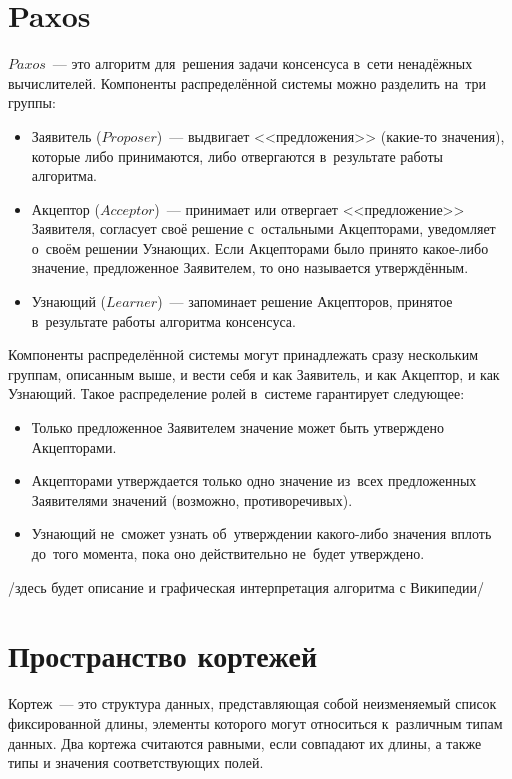 \section{Paxos}\label{sec:3}
$Paxos$~--- это алгоритм для~решения задачи консенсуса в~сети ненадёжных вычислителей. Компоненты распределённой системы можно разделить на~три группы:
\begin{itemize}
	\item Заявитель ($Proposer$)~--- выдвигает <<предложения>> (какие-то значения), которые либо принимаются, либо отвергаются в~результате работы алгоритма.
	\item Акцептор ($Acceptor$)~--- принимает или отвергает <<предложение>> Заявителя, согласует своё решение с~остальными Акцепторами, уведомляет о~своём решении Узнающих. Если Акцепторами было принято какое-либо значение, предложенное Заявителем, то оно называется утверждённым.
	\item Узнающий ($Learner$)~--- запоминает решение Акцепторов, принятое в~результате работы алгоритма консенсуса.
\end{itemize}

Компоненты распределённой системы могут принадлежать сразу нескольким группам, описанным выше, и вести себя и как Заявитель, и как Акцептор, и как Узнающий. Такое распределение ролей в~системе гарантирует следующее:
\begin{itemize}
	\item Только предложенное Заявителем значение может быть утверждено Акцепторами.
	\item Акцепторами утверждается только одно значение из~всех предложенных Заявителями значений (возможно, противоречивых).
	\item Узнающий не~сможет узнать об~утверждении какого-либо значения вплоть до~того момента, пока оно действительно не~будет утверждено.
\end{itemize}

/здесь будет описание и графическая интерпретация алгоритма с Википедии/


\section{Пространство кортежей}\label{sec:4}
Кортеж~--- это структура данных, представляющая собой неизменяемый список фиксированной длины, элементы которого могут относиться к~различным типам данных. Два кортежа считаются равными, если совпадают их длины, а также типы и значения соответствующих полей.

